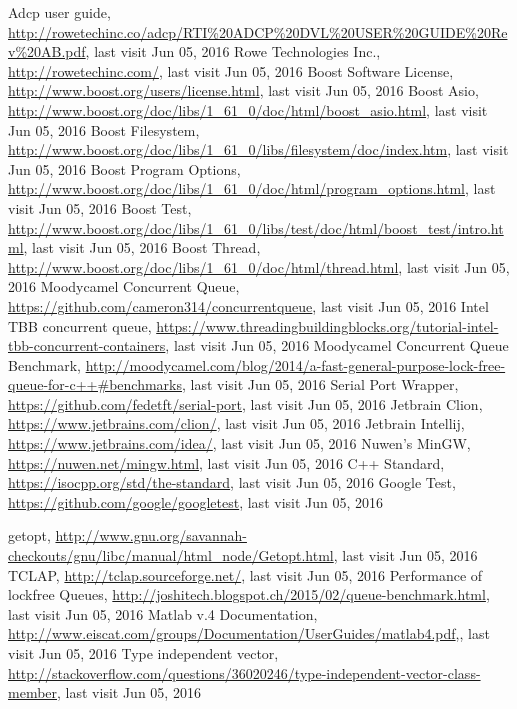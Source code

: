 \begin{thebibliography}{99}

Adcp user guide, \url{http://rowetechinc.co/adcp/RTI%20ADCP%20DVL%20USER%20GUIDE%20Rev%20AB.pdf}, last visit Jun 05, 2016
Rowe Technologies Inc., \url{http://rowetechinc.com/}, last visit Jun 05, 2016
 Boost Software License, \url{http://www.boost.org/users/license.html}, last visit Jun 05, 2016
 Boost Asio, \url{http://www.boost.org/doc/libs/1\_61\_0/doc/html/boost\_asio.html}, last visit Jun 05, 2016
 Boost Filesystem, \url{http://www.boost.org/doc/libs/1\_61\_0/libs/filesystem/doc/index.htm}, last visit Jun 05, 2016
 Boost Program Options, \url{http://www.boost.org/doc/libs/1\_61\_0/doc/html/program\_options.html}, last visit Jun 05, 2016
 Boost Test, \url{http://www.boost.org/doc/libs/1\_61\_0/libs/test/doc/html/boost\_test/intro.html}, last visit Jun 05, 2016
 Boost Thread, \url{http://www.boost.org/doc/libs/1\_61\_0/doc/html/thread.html}, last visit Jun 05, 2016
 Moodycamel Concurrent Queue, \url{https://github.com/cameron314/concurrentqueue}, last visit Jun 05, 2016
 Intel TBB concurrent queue, \url{https://www.threadingbuildingblocks.org/tutorial-intel-tbb-concurrent-containers}, last visit Jun 05, 2016
 Moodycamel Concurrent Queue Benchmark, \url{http://moodycamel.com/blog/2014/a-fast-general-purpose-lock-free-queue-for-c++#benchmarks}, last visit Jun 05, 2016
Serial Port Wrapper, \url{https://github.com/fedetft/serial-port}, last visit Jun 05, 2016
Jetbrain Clion, \url{https://www.jetbrains.com/clion/}, last visit Jun 05, 2016
 Jetbrain Intellij, \url{https://www.jetbrains.com/idea/}, last visit Jun 05, 2016
Nuwen's MinGW, \url{https://nuwen.net/mingw.html}, last visit Jun 05, 2016
C++ Standard, \url{https://isocpp.org/std/the-standard}, last visit Jun 05, 2016
Google Test, \url{https://github.com/google/googletest}, last visit Jun 05, 2016

getopt, \url{http://www.gnu.org/savannah-checkouts/gnu/libc/manual/html_node/Getopt.html}, last visit Jun 05, 2016
TCLAP, \url{http://tclap.sourceforge.net/}, last visit Jun 05, 2016
 Performance of lockfree Queues, \url{http://joshitech.blogspot.ch/2015/02/queue-benchmark.html}, last visit Jun 05, 2016
 Matlab v.4 Documentation, \url{http://www.eiscat.com/groups/Documentation/UserGuides/matlab4.pdf},, last visit Jun 05, 2016
 Type independent vector, \url{http://stackoverflow.com/questions/36020246/type-independent-vector-class-member}, last visit Jun 05, 2016

\end{thebibliography}

